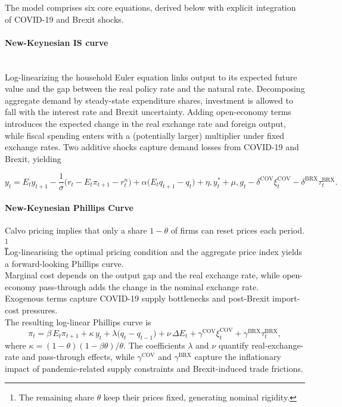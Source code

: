 \documentclass[
]{article}
\begin{document}
	The model comprises six core equations, derived below with explicit integration of COVID-19 and Brexit shocks.
	
	\paragraph*{New-Keynesian IS curve} \\
	
	Log-linearizing the household Euler equation links output to its expected future value and the gap between the real policy rate and the natural rate. Decomposing aggregate demand by steady-state expenditure shares, investment is allowed to fall with the interest rate and Brexit uncertainty. Adding open-economy terms introduces the expected change in the real exchange rate and foreign output, while fiscal spending enters with a (potentially larger) multiplier under fixed exchange rates. Two additive shocks capture demand losses from COVID-19 and Brexit, yielding
	
	\begin{equation}
		y_t = E_t y_{t+1}
		- \frac{1}{\sigma}\bigl(r_t - E_t\pi_{t+1} - r_t^{n}\bigr)
		+ \alpha\bigl(E_t q_{t+1} - q_t\bigr)
		+ \eta,y_t^{*}
		+ \mu,g_t
		- \delta^{\mathrm{COV}}\xi_t^{\mathrm{COV}}
		- \delta^{\mathrm{BRX}}\tau_t^{\mathrm{BRX}}.
	\end{equation}
	
	\paragraph*{New-Keynesian Phillips Curve}
	Calvo pricing implies that only a share \(1-\theta\) of firms can reset prices each period.
	\footnote{The remaining share \(\theta\) keep their prices fixed, generating nominal rigidity.} \\
	Log-linearising the optimal pricing condition and the aggregate price index yields a forward-looking Phillips curve. \\
	Marginal cost depends on the output gap and the real exchange rate, while open-economy pass-through adds the change in the nominal exchange rate. \\
	Exogenous terms capture COVID-19 supply bottlenecks and post-Brexit import-cost pressures. \\
	The resulting log-linear Phillips curve is
	\begin{equation}
		\pi_t
		= \beta\,E_t\pi_{t+1}
		+ \kappa\,y_t
		+ \lambda\bigl(q_t - q_{t-1}\bigr)
		+ \nu\,\Delta E_t
		+ \gamma^{\mathrm{COV}}\xi_t^{\mathrm{COV}}
		+ \gamma^{\mathrm{BRX}}\tau_t^{\mathrm{BRX}},
		\label{eq:phillips_condensed}
	\end{equation}
	where \(\kappa=(1-\theta)(1-\beta\theta)/\theta\).
	The coefficients \(\lambda\) and \(\nu\) quantify real-exchange-rate and pass-through effects, while \(\gamma^{\mathrm{COV}}\) and \(\gamma^{\mathrm{BRX}}\) capture the inflationary impact of pandemic-related supply constraints and Brexit-induced trade frictions.
	
\end{document}
